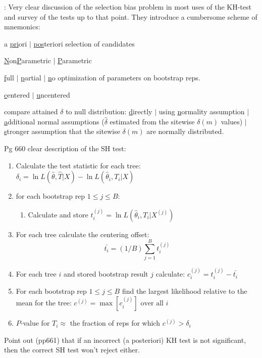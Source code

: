 \documentclass[11pt]{article}
\newcommand{\boot}[1]{X^{(#1)}}
\newcommand{\pvalue}{$P$-value\xspace}
\begin{document}
\citet{GoldmanAR2000}: Very clear discussion of the selection bias problem in most uses of the KH-test and survey of the tests up to that point. They introduce a cumbersome scheme of mnemonics:
\begin{compactitem}
	\item a \underline{pri}ori $|$ \underline{pos}teriori selection of candidates
	\item \underline{N}on\underline{P}arametric $|$ \underline{P}arametric
	\item \underline{f}ull $|$ \underline{p}artial $|$ \underline{n}o optimization of parameters on bootstrap reps.
	\item \underline{c}entered $|$ \underline{u}ncentered
	\item compare attained $\delta$ to null distribution: \underline{d}irectly $|$ using \underline{n}ormality assumption $|$ \underline{a}dditional normal assumptions ($\hat{\delta}$ estimated from the sitewise $\delta(m)$ values) $|$ \underline{s}tronger assumption that the sitewise $\delta(m)$ are normally distributed.
\end{compactitem}

Pg 660 clear description of the SH test:
\begin{enumerate}
	\item Calculate the test statistic for each tree: $\delta_i = \ln L(\hat\theta,\hat{T}|X) - \ln L(\hat\theta_i, T_i|X)$
	\item for each bootstrap rep $1 \leq j \leq B$:
	\begin{enumerate}
		\item Calculate and store $t_i^{(j)} = \ln L(\hat\theta_i, T_i|\boot{j})$
	\end{enumerate}
	\item For each tree calculate the centering offset: $$\bar{t_i} = (1/B)\sum_{j=1}^Bt_i^{(j)}$$
	\item For each tree $i$ and stored bootstrap result $j$ calculate: ${c_i^{(j)}} = t_i^{(j)} - \bar{t_i}$
	\item For each bootstrap rep $1 \leq j \leq B$ find the largest likelihood relative to the mean for the tree: $c^{(j)} = \max\left[c_i^{(j)}\right] \mbox{ over all } i$
	\item \pvalue for $T_i\approx$ the fraction of reps for which $c^{(j)} > \delta_i$
\end{enumerate}

Point out (pp661) that if an incorrect (a posteriori) KH test is not significant, then the correct SH test won't reject either.
\end{document}
